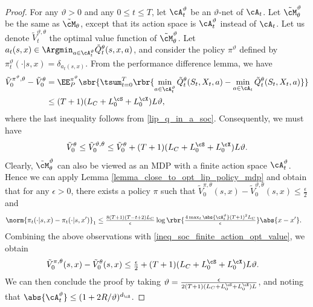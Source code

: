 \documentclass[9pt]{article}
\numberwithin{equation}{section}
\renewcommand{\frac}[2]{\tfrac{#1}{#2}}
\begin{document}
\begin{proof}
 For any $\vartheta > 0$ and any $0 \leq t \leq T$, let $\cA_t^\vartheta$ be an $\vartheta$-net of $\cA_t$.
 Let $\tilde{\cM}^\vartheta_\theta$ be the same as $\tilde{\cM}_\theta$, except that its action space is ${\cA}_t^\vartheta$ instead of $\cA_t$.
 Let us denote $\tilde{V}^{\vartheta,\theta}_t$ the optimal value function of $\tilde{\cM}^\vartheta_\theta$.
 Let $a_t(s,x) \in \Argmin_{a \in \cA_t^\vartheta} \tilde{Q}^\theta_t(s,x,a)$, and consider the policy $\pi^\vartheta$ defined by
 $
 \pi^\vartheta_t (\cdot|s,x) = \delta_{a_t(s,x)}.
 $
 From the performance difference lemma, we have 
 \begin{align*}
     \tilde{V}^{\pi^\vartheta, \theta}_0 -  \tilde{V}^{ \theta}_0
     & = \EE_{P}^{\pi^\vartheta} \sbr{
     \tsum_{t=0}^T \rbr{ \min_{a \in \cA_t^\vartheta} \tilde{Q}_t^\theta (S_t, X_t, a) - \min_{a \in \cA_t} \tilde{Q}_t^\theta (S_t, X_t, a)  }
     } \\ 
     & \leq (T+1) ( L_C   
     + L_0^{\cS}  
     + L_0^{\cX} ) L   \vartheta,
 \end{align*}
 where the last inequality follows from \eqref{lip_q_in_a_soc}.
 Consequently, we must have 
 \begin{align}\label{ineq_soc_finite_action_opt_value}
 \tilde{V}^{\theta}_0 \leq  \tilde{V}^{\vartheta, \theta}_0
 \leq \tilde{V}^{\theta}_0 + (T+1) ( L_C   
     + L_0^{\cS}  
     + L_0^{\cX} ) L   \vartheta.
 \end{align}
 Clearly, $\tilde{\cM}^\vartheta_\theta$ can also be viewed as an MDP with  a finite action space $\cA_t^\vartheta$. 
 Hence we can apply Lemma \ref{lemma_close_to_opt_lip_policy_mdp} and obtain that for any $\epsilon > 0$, there exists a policy $\pi$ such that
 $
   \tilde{V}^{\pi, \theta}_0(s,x) -  \tilde{V}^{\vartheta, \theta}_0(s,x)  \leq \frac{\epsilon}{2} 
 $
 and 
 \begin{align*}
     \norm{
     \pi_t(\cdot|s,x) -  \pi_t(\cdot|s,x') 
     }_1 
     & \leq 
     \frac{8 (T+1)  (T-t+2) L_C}{\epsilon}
     \log \rbr{
     \frac{4 \max_t \abs{\cA_t^\vartheta} (T+1)^2 L_C }{\epsilon }
     } \abs{x - x'}.
 \end{align*}
 Combining the above observations with \eqref{ineq_soc_finite_action_opt_value}, we obtain 
 \begin{align*}
             \tilde{V}^{\pi, \theta}_0(s,x) -  \tilde{V}^{\theta}_0(s,x) & \leq \frac{\epsilon}{2} 
             + (T+1) ( L_C   
     + L_0^{\cS}  
     + L_0^{\cX} ) L   \vartheta.
 \end{align*}
 We can then conclude the proof by taking $\vartheta = \frac{\epsilon}{2(T+1) ( L_C   
 + L_0^{\cS}  
 + L_0^{\cX} ) L} $,
 and noting that
 $
     \abs{\cA^\vartheta_t} \leq (1 + 2R/\vartheta)^{d_{\cA}}
 $.
 \end{proof}
\end{document}
